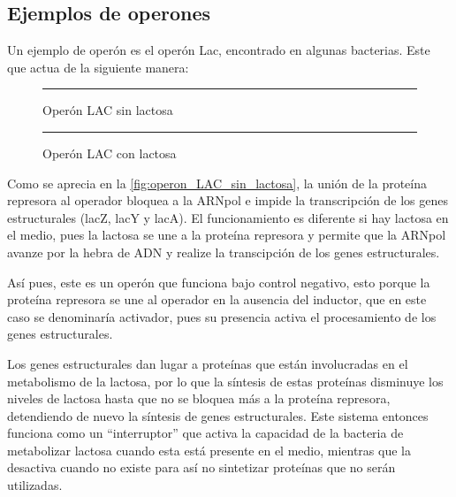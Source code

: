 \subsection{Ejemplos de operones}



Un ejemplo de operón es el operón Lac, encontrado en algunas bacterias. Este que actua de la siguiente manera:

\begin{figure}[H]
    \centering
    \resizebox{\linewidth}{!}{}
    \rule{\linewidth}{0.2pt}
    \caption[Operón LAC sin lactosa]{Operón LAC sin lactosa}
    \label{fig:operon_LAC_sin_lactosa}
\end{figure}

\begin{figure}[H]
    \centering
    \resizebox{\linewidth}{!}{}
    \rule{\linewidth}{0.2pt}
    \caption[Operón LAC con lactosa]{Operón LAC con lactosa}
    \label{fig:operon_LAC_con_lactosa}
\end{figure}

Como se aprecia en la \autoref{fig:operon_LAC_sin_lactosa}, la unión de la proteína represora al operador bloquea a la ARNpol e impide la transcripción de los genes estructurales (lacZ, lacY y lacA). El funcionamiento es diferente si hay lactosa en el medio, pues la lactosa se une a la proteína represora y permite que la ARNpol avanze por la hebra de ADN y realize la transcipción de los genes estructurales.

Así pues, este es un operón que funciona bajo control negativo, esto porque la proteína represora se une al operador en la ausencia del inductor, que en este caso se denominaría activador, pues su presencia activa el procesamiento de los genes estructurales.

Los genes estructurales dan lugar a proteínas que están involucradas en el metabolismo de la lactosa, por lo que la síntesis de estas proteínas disminuye los niveles de lactosa hasta que no se bloquea más a la proteína represora, detendiendo de nuevo la síntesis de genes estructurales. Este sistema entonces funciona como un ``interruptor'' que activa la capacidad de la bacteria de metabolizar lactosa cuando esta está presente en el medio, mientras que la desactiva cuando no existe para así no sintetizar proteínas que no serán utilizadas.

